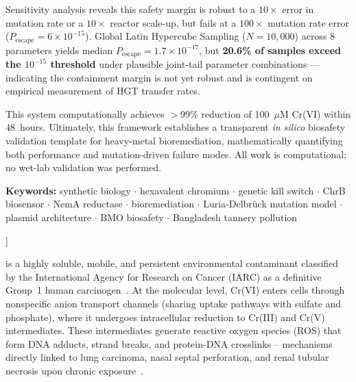 \documentclass[10pt,twocolumn,letterpaper,
              colorlinks=true,
              linkcolor=blue!70!black,
              citecolor=blue!70!black,
              urlcolor=blue!70!black,
              pdfborder={0 0 0}]{article}
\begin{document}
  \medskip\noindent
  Sensitivity analysis reveals this safety margin is robust to a $10\times$
  error in mutation rate or a $10\times$ reactor scale-up, but fails at a
  $100\times$ mutation rate error ($P_{\text{escape}} = 6 \times 10^{-15}$).
  Global Latin Hypercube Sampling ($N = 10{,}000$) across 8 parameters yields
  median $P_{\text{escape}} = 1.7 \times 10^{-17}$, but \textbf{20.6\% of samples
  exceed the $10^{-15}$ threshold} under plausible joint-tail parameter
  combinations --- indicating the containment margin is not yet robust and is
  contingent on empirical measurement of HGT transfer rates.

  \medskip\noindent
  This system computationally achieves ${>}99\%$ reduction of 100~$\mu$M
  Cr(VI) within 48~hours. Ultimately, this framework establishes a transparent
  \textit{in silico} biosafety validation template for heavy-metal
  bioremediation, mathematically quantifying both performance and
  mutation-driven failure modes. All work is computational; no wet-lab
  validation was performed.

  \vspace{0.5em}
  \begin{center}
    \textbf{Keywords:}
    synthetic biology $\cdot$ hexavalent chromium $\cdot$
    genetic kill switch $\cdot$ ChrB biosensor $\cdot$
    NemA reductase $\cdot$ bioremediation $\cdot$
    Luria-Delbr\"{u}ck mutation model $\cdot$
    plasmid architecture $\cdot$ BMO biosafety $\cdot$
    Bangladesh tannery pollution
  \end{center}
  \vspace{1em}
    ]
    
\twocolumn[
\section{Introduction}

\subsection{The Hexavalent Chromium Crisis in Bangladesh}

Hexavalent chromium [Cr(VI)] is a highly soluble, mobile, and persistent
environmental contaminant classified by the International Agency for
Research on Cancer (IARC) as a definitive Group~1 human
carcinogen~\cite{iarc1990}. At the molecular level, Cr(VI) enters cells
through nonspecific anion transport channels (sharing uptake pathways with
sulfate and phosphate), where it undergoes intracellular reduction to
Cr(III) and Cr(V) intermediates. These intermediates generate reactive
oxygen species (ROS) that form DNA adducts, strand breaks, and
protein-DNA crosslinks -- mechanisms directly linked to lung carcinoma,
nasal septal perforation, and renal tubular necrosis upon chronic
exposure~\cite{eastmond2008}.
\end{document}
